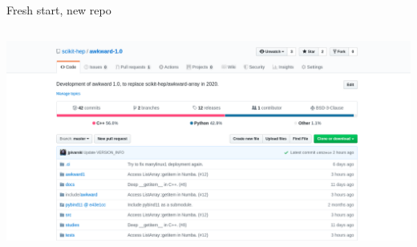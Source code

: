 \documentclass[aspectratio=169]{beamer}
\begin{document}
\begin{frame}{Fresh start, new repo}
\vspace{0.2 cm}
\begin{columns}
\includegraphics[width=\linewidth]{awkward-1-github.png}
\end{columns}
\end{frame}
\end{document}
